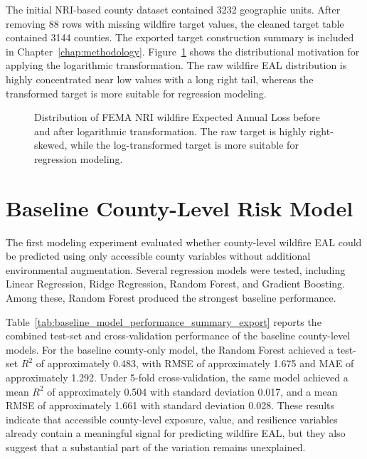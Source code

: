 The initial NRI-based county dataset contained 3232 geographic units. After removing 88 rows with missing wildfire target values, the cleaned target table contained 3144 counties. The exported target construction summary is included in Chapter~\ref{chap:methodology}. Figure~\ref{fig:eal_raw_log_distribution} shows the distributional motivation for applying the logarithmic transformation. The raw wildfire EAL distribution is highly concentrated near low values with a long right tail, whereas the transformed target is more suitable for regression modeling.

\begin{figure}[htbp]
    \centering
    \caption{Distribution of FEMA NRI wildfire Expected Annual Loss before and after logarithmic transformation. The raw target is highly right-skewed, while the log-transformed target is more suitable for regression modeling.}
    \label{fig:eal_raw_log_distribution}
\end{figure}

\section{Baseline County-Level Risk Model}

The first modeling experiment evaluated whether county-level wildfire EAL could be predicted using only accessible county variables without additional environmental augmentation. Several regression models were tested, including Linear Regression, Ridge Regression, Random Forest, and Gradient Boosting. Among these, Random Forest produced the strongest baseline performance.

Table~\ref{tab:baseline_model_performance_summary_export} reports the combined test-set and cross-validation performance of the baseline county-level models. For the baseline county-only model, the Random Forest achieved a test-set $R^2$ of approximately 0.483, with RMSE of approximately 1.675 and MAE of approximately 1.292. Under 5-fold cross-validation, the same model achieved a mean $R^2$ of approximately 0.504 with standard deviation 0.017, and a mean RMSE of approximately 1.661 with standard deviation 0.028. These results indicate that accessible county-level exposure, value, and resilience variables already contain a meaningful signal for predicting wildfire EAL, but they also suggest that a substantial part of the variation remains unexplained.

